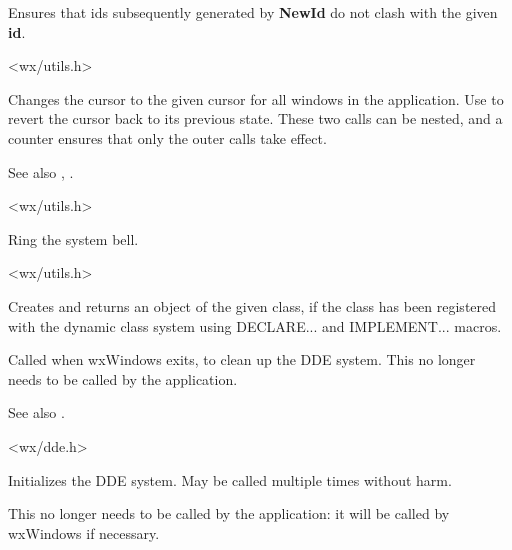Ensures that ids subsequently generated by {\bf NewId} do not clash with
the given {\bf id}.


<wx/utils.h>

\label{wxbeginbusycursor}


Changes the cursor to the given cursor for all windows in the application.
Use  to revert the cursor back
to its previous state. These two calls can be nested, and a counter
ensures that only the outer calls take effect.

See also , .


<wx/utils.h>



Ring the system bell.


<wx/utils.h>

\label{wxcreatedynamicobject}


Creates and returns an object of the given class, if the class has been
registered with the dynamic class system using DECLARE... and IMPLEMENT... macros.

\label{wxddecleanup}


Called when wxWindows exits, to clean up the DDE system. This no longer needs to be
called by the application.

See also .


<wx/dde.h>

\label{wxddeinitialize}


Initializes the DDE system. May be called multiple times without harm.

This no longer needs to be called by the application: it will be called
by wxWindows if necessary.

